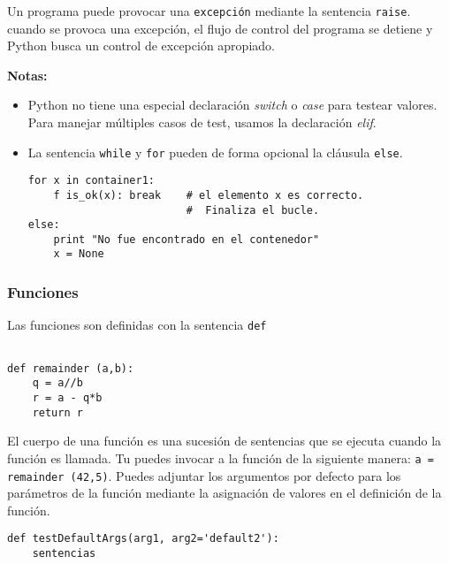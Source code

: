 \documentclass[10pt]{beamer}
\begin{document}
\begin{frame}[fragile]
\frametitle{}
Un programa puede provocar una \texttt{excepci\'on} mediante la sentencia \texttt{raise}. cuando se provoca una excepci\'on, el flujo de control del programa se detiene y Python busca un control de excepci\'on apropiado.

\vspace{0.4cm}

\textbf{Notas:}

\vspace{0.2cm}

\begin{itemize}
\item Python no tiene una especial declaraci\'on \textit{switch} o \textit{case} para testear valores. Para manejar m\'ultiples casos de test, usamos la declaraci\'on \textit{elif}.
\item La sentencia \texttt{while} y \texttt{for} pueden de forma opcional la cl\'ausula \texttt{else}.

\begin{lstlisting}
for x in container1:
    f is_ok(x): break    # el elemento x es correcto.
                         #  Finaliza el bucle.
else:
    print "No fue encontrado en el contenedor"
    x = None                        
\end{lstlisting}
\end{itemize}
\end{frame}

\begin{frame}[fragile]
\frametitle{Funciones}
Las funciones son definidas con la sentencia \texttt{def}

\vspace{0.2cm}


\begin{lstlisting}

def remainder (a,b):
    q = a//b       
    r = a - q*b
    return r
\end{lstlisting}

\vspace{0.2cm}

El cuerpo de una funci\'on es una sucesi\'on de sentencias que se ejecuta cuando la funci\'on es llamada. Tu puedes invocar a la funci\'on de la siguiente manera: \texttt{a = remainder (42,5)}. Puedes adjuntar los argumentos por defecto para los par\'ametros de la funci\'on mediante la asignaci\'on de valores en el definici\'on de la funci\'on.

\vspace{0.2cm}

\begin{lstlisting}
def testDefaultArgs(arg1, arg2='default2'):
    sentencias
\end{lstlisting}

\end{frame}
\end{document}
